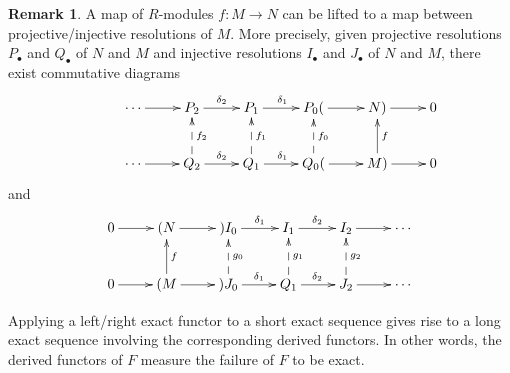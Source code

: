 \documentclass[11pt]{book}
\numberwithin{equation}{section}
\numberwithin{theorem}{chapter}
\theoremstyle{definition}
\newtheorem*{basic properties}{Basic Properties}
\newtheorem*{Important Remark}{Important Remark}
\newtheorem{remark}[theorem]{Remark}
\theoremstyle{remark}
\begin{document}
\begin{remark}
	A map of $R$-modules $f \!: M \longrightarrow N$ can be lifted to a map between projective/injective resolutions of $M$. More precisely, given projective resolutions $P_\bullet$ and $Q_\bullet$ of $N$ and $M$ and injective resolutions $I_\bullet$ and $J_\bullet$ of $N$ and $M$, there exist commutative diagrams
	$$\xymatrix{& \cdots \ar[r] & P_{2} \ar[r]^-{\delta_{2}} & P_1 \ar[r]^{\delta_1} & P_{0} (\ar[r] & N ) \ar[r] & 0 \\ 
	& \cdots \ar[r] & Q_{2} \ar@{-->}[u]_-{f_2} \ar[r]^-{\delta_{2}} & Q_1 \ar@{-->}[u]_-{f_1} \ar[r]^{\delta_1} & Q_{0} \ar@{-->}[u]_-{f_0} (\ar[r] & M \ar[u]_-{f} ) \ar[r] & 0}$$
	and
	$$\xymatrix{0 \ar[r] & (N \ar[r]  &) I_{0} \ar[r]^-{\delta_{1}} & I_1 \ar[r]^{\delta_2} & I_{2} \ar[r] & \cdots \\ 
	0 \ar[r] & (M \ar[r]\ar[u]_-{f}  & ) J_{0} \ar@{-->}[u]_-{g_0} \ar[r]^-{\delta_{1}} & Q_1 \ar@{-->}[u]_-{g_1} \ar[r]^{\delta_2} & J_{2} \ar@{-->}[u]_-{g_2} \ar[r] & \cdots}$$
\end{remark}




Applying a left/right exact functor to a short exact sequence gives rise to a long exact sequence involving the corresponding derived functors. In other words, the derived functors of $F$ measure the failure of $F$ to be exact.
\end{document}
